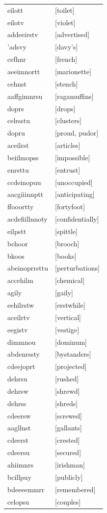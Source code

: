 \documentclass{article}
\begin{document}
\begin{tabular}{ll}
eilott & [toilet] \\
eilotv & [violet] \\
addeeirstv & [advertised] \\
'adsvy & [davy's] \\
cefhnr & [french] \\
aeeimnortt & [marionette] \\
cehnst & [stench] \\
aaffgimnrsu & [ragamuffins] \\
doprs & [drops] \\
celrsstu & [clusters] \\
dopru & [proud, pudor] \\
aceilrst & [articles] \\
beiilmopss & [impossible] \\
enrsttu & [entrust] \\
ccdeinopuu & [unoccupied] \\
aacgiiinnptt & [anticipating] \\
ffooortty & [fortyfoot] \\
acdefiillnnoty & [confidentially] \\
eilpstt & [spittle] \\
bchoor & [brooch] \\
bkoos & [books] \\
abeinoprrsttu & [perturbations] \\
accehilm & [chemical] \\
agily & [gaily] \\
eehilrstw & [erstwhile] \\
aceilrtv & [vertical] \\
eegistv & [vestige] \\
dimmnou & [dominum] \\
abdenrssty & [bystanders] \\
cdeejoprt & [projected] \\
dehrsu & [rushed] \\
dehrsw & [shrewd] \\
dehrss & [shreds] \\
cdeersw & [screwed] \\
aagllnst & [gallants] \\
cdeerst & [crested] \\
cdeersu & [secured] \\
ahiimnrs & [irishman] \\
bcillpuy & [publicly] \\
bdeeeemmrr & [remembered] \\
celopsu & [couples] \\

\end{tabular}
\end{document}
